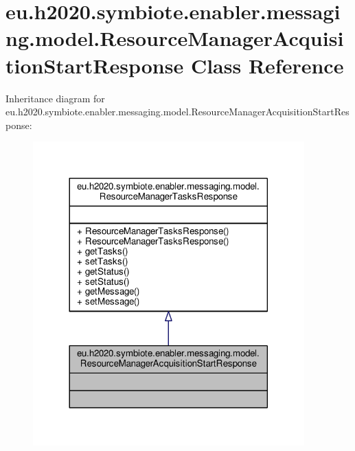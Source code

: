 \hypertarget{classeu_1_1h2020_1_1symbiote_1_1enabler_1_1messaging_1_1model_1_1ResourceManagerAcquisitionStartResponse}{}\section{eu.\+h2020.\+symbiote.\+enabler.\+messaging.\+model.\+Resource\+Manager\+Acquisition\+Start\+Response Class Reference}
\label{classeu_1_1h2020_1_1symbiote_1_1enabler_1_1messaging_1_1model_1_1ResourceManagerAcquisitionStartResponse}


Inheritance diagram for eu.\+h2020.\+symbiote.\+enabler.\+messaging.\+model.\+Resource\+Manager\+Acquisition\+Start\+Response\+:
\nopagebreak
\begin{figure}[H]
\begin{center}
\leavevmode
\includegraphics[width=296pt]{classeu_1_1h2020_1_1symbiote_1_1enabler_1_1messaging_1_1model_1_1ResourceManagerAcquisitionStartResponse__inherit__graph}
\end{center}
\end{figure}


